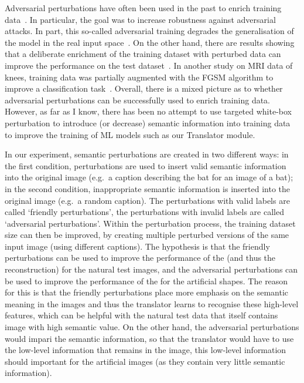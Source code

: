 Adversarial perturbations have often been used in the past to enrich training data~\cite{goodfellowExplainingHarnessingAdversarial2014,madryDeepLearningModels2019}. In particular, the goal was to increase robustness against adversarial attacks. In part, this so-called adversarial training degrades the generalisation of the model in the real input space~\cite{kurakinAdversarialMachineLearning2017}. On the other hand, there are results showing that a deliberate enrichment of the training dataset with perturbed data can improve the performance on the test dataset~\cite{xieAdversarialExamplesImprove2020}.  In another study on MRI data of knees, training data was partially augmented with the FGSM algorithm to improve a classification task~\cite{yanEnhancingClassificationPerformance2023}. Overall, there is a mixed picture as to whether adversarial perturbations can be successfully used to enrich training data. However, as far as I know, there has been no attempt to use targeted white-box perturbation to introduce (or decrease) semantic information into training data to improve the training of ML models such as our Translator module. 


In our experiment, semantic perturbations are created in two different ways: in the first condition, perturbations are used to insert valid semantic information into the original image (e.g.\ a caption describing the bat for an image of a bat); in the second condition, inappropriate semantic information is inserted into the original image (e.g.\ a random caption). The perturbations with valid labels are called `friendly perturbations', the perturbations with invalid labels are called `adversarial perturbations'. Within the perturbation process, the training dataset size can then be improved, by creating multiple perturbed versions of the same input image (using different captions). The  hypothesis is that the friendly perturbations can be used to improve the performance of the  (and thus the reconstruction) for the natural test images, and the adversarial perturbations can be used to improve the performance of the  for the artificial shapes. The reason for this is that the friendly perturbations place more emphasis on the semantic meaning in the images and thus the translator learns to recognise these high-level features, which can be helpful with the natural test data that itself contains image with high semantic value. On the other hand, the adversarial perturbations would impari the semantic information, so that the translator would have to use the low-level information that remains in the image, this low-level information should important for the artificial images (as they contain very little semantic information).



